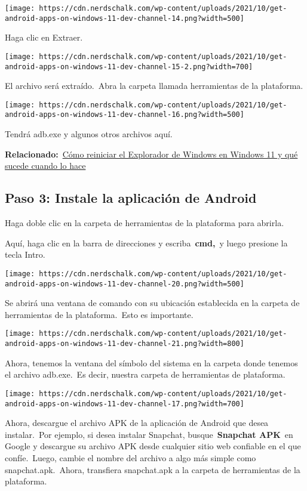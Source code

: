 \documentclass[
  letterpaper,
]{article}
\begin{document}
\texttt{[image: https://cdn.nerdschalk.com/wp-content/uploads/2021/10/get-android-apps-on-windows-11-dev-channel-14.png?width=500]}

Haga clic en Extraer.

\texttt{[image: https://cdn.nerdschalk.com/wp-content/uploads/2021/10/get-android-apps-on-windows-11-dev-channel-15-2.png?width=700]}

El archivo será extraído.~Abra la carpeta llamada herramientas de la
plataforma.

\texttt{[image: https://cdn.nerdschalk.com/wp-content/uploads/2021/10/get-android-apps-on-windows-11-dev-channel-16.png?width=500]}

Tendrá adb.exe y algunos otros archivos aquí.

\textbf{Relacionado:}~\href{https://nerdschalk.com/how-to-restart-windows-explorer-on-windows-11-and-what-happens-when-you-do-it/}{Cómo
reiniciar el Explorador de Windows en Windows 11 y qué sucede cuando lo
hace}

\hypertarget{paso-3-instale-la-aplicaciuxf3n-de-android}{%
\subsection{Paso 3: Instale la aplicación de
Android}\label{paso-3-instale-la-aplicaciuxf3n-de-android}}

Haga doble clic en la carpeta de herramientas de la plataforma para
abrirla.

Aquí, haga clic en la barra de direcciones y escriba~\textbf{cmd,}~y
luego presione la tecla Intro.

\texttt{[image: https://cdn.nerdschalk.com/wp-content/uploads/2021/10/get-android-apps-on-windows-11-dev-channel-20.png?width=500]}

Se abrirá una ventana de comando con su ubicación establecida en la
carpeta de herramientas de la plataforma.~Esto es importante.

\texttt{[image: https://cdn.nerdschalk.com/wp-content/uploads/2021/10/get-android-apps-on-windows-11-dev-channel-21.png?width=800]}

Ahora, tenemos la ventana del símbolo del sistema en la carpeta donde
tenemos el archivo adb.exe.~Es decir, nuestra carpeta de herramientas de
plataforma.

\texttt{[image: https://cdn.nerdschalk.com/wp-content/uploads/2021/10/get-android-apps-on-windows-11-dev-channel-17.png?width=700]}

Ahora, descargue el archivo APK de la aplicación de Android que desea
instalar.~Por ejemplo, si desea instalar Snapchat,
busque~\textbf{Snapchat APK}~en Google y descargue su archivo APK desde
cualquier sitio web confiable en el que confíe.~Luego, cambie el nombre
del archivo a algo más simple como snapchat.apk.~Ahora, transfiera
snapchat.apk a la carpeta de herramientas de la plataforma.
\end{document}
